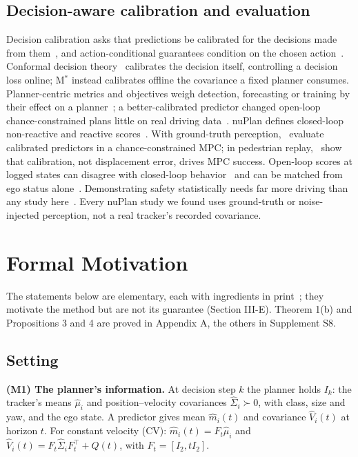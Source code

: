 \documentclass{ieeeaccess}
\begin{document}
\subsection{Decision-aware calibration and evaluation}
Decision calibration asks that predictions be calibrated for the decisions made from them~\cite{Zhao2021,Sahoo2021,Kiyani2026,Tang2026,Noarov2025}, and action-conditional guarantees condition on the chosen action~\cite{Zhu2026}. Conformal decision theory~\cite{Lekeufack2024} calibrates the decision itself, controlling a decision loss online; M$^{*}$ instead calibrates offline the covariance a fixed planner consumes. Planner-centric metrics and objectives weigh detection, forecasting or training by their effect on a planner~\cite{Philion2020,IvanovicPavone2022,McAllister2022}; a better-calibrated predictor changed open-loop chance-constrained plans little on real driving data~\cite{IvanovicA2024}. nuPlan defines closed-loop non-reactive and reactive scores~\cite{Karnchanachari2024}. With ground-truth perception,~\cite{Shah2026} evaluate calibrated predictors in a chance-constrained MPC; in pedestrian replay,~\cite{Pouria2026} show that calibration, not displacement error, drives MPC success. Open-loop scores at logged states can disagree with closed-loop behavior~\cite{Dauner2023,Karnchanachari2024} and can be matched from ego status alone~\cite{Li2024Ego}. Demonstrating safety statistically needs far more driving than any study here~\cite{KalraPaddock2016}. Every nuPlan study we found uses ground-truth or noise-injected perception, not a real tracker's recorded covariance.

\section{Formal Motivation}
The statements below are elementary, each with ingredients in print~\cite{Gneiting2007,Ziegel2014,Forsling2025}; they motivate the method but are not its guarantee (Section III-E). Theorem 1(b) and Propositions 3 and 4 are proved in Appendix A, the others in Supplement S8.

\subsection{Setting}
\textbf{(M1) The planner's information.} At decision step $k$ the planner holds $I_{k}$: the tracker's means $\hat{\mu}_{i}$ and position--velocity covariances $\hat{\Sigma}_{i} \succ 0$, with class, size and yaw, and the ego state. A predictor gives mean $\hat{m}_{i}(t)$ and covariance $\hat{V}_{i}(t)$ at horizon $t$. For constant velocity (CV): $\hat{m}_{i}(t) = F_{t}\hat{\mu}_{i}$ and $\hat{V}_{i}(t) = F_{t}\hat{\Sigma}_{i}F_{t}^{\top} + Q(t)$, with $F_{t} = [I_{2}, tI_{2}]$.
\end{document}
